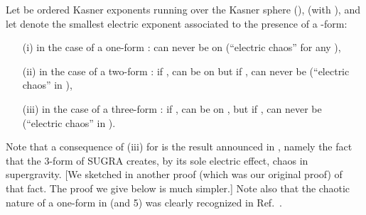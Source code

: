 \documentclass[a4paper,12pt]{article}
\begin{document}
\medskip

 Let \coordHE{} be 
ordered Kasner exponents running over the Kasner sphere \coordHE{}
(\coordHE{}), 
(with \coordHE{}), and let \coordHE{} denote the smallest electric exponent 
associated to the presence of a \coordHE{}-form:
\begin{itemize}
\item[(i)] in the case of a one-form \coordHE{}: \coordHE{} can never be \coordHE{} on \coordHE{} (``electric chaos'' for any 
\coordHE{}),
\item[(ii)] in the case of a two-form \coordHE{}: if \coordHE{}, \coordHE{} can be \coordHE{} on \coordHE{} but if \coordHE{}, \coordHE{} can never be \coordHE{} (``electric chaos'' in \coordHE{}),
\item[(iii)] in the case of a three-form \coordHE{}: if \coordHE{}, 
\coordHE{} can be \coordHE{} on \coordHE{}, 
but if \coordHE{}, \coordHE{} can never be \coordHE{} (``electric 
chaos'' in \coordHE{}).
\end{itemize}

\medskip

Note that a consequence of (iii) for \coordHE{} is the result announced in \cite{dh1}, 
namely the fact that the 3-form of SUGRA creates, by its sole electric 
effect, chaos in \coordHE{} supergravity. [We sketched in \cite{dh1} 
another proof (which was our original proof) of that fact. The proof we 
give below is much simpler.] Note also that the chaotic nature of a 
one-form in \coordHE{} (and 5) was clearly recognized in Ref.~\cite{BK81}.
\end{document}
